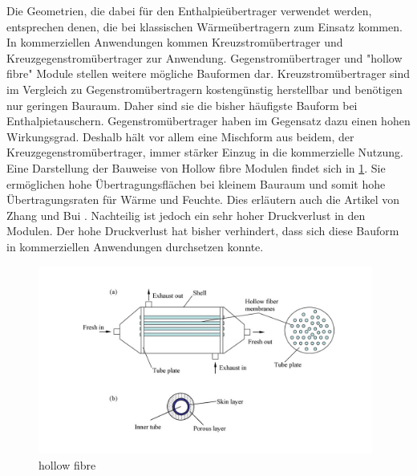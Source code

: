 \begin{normalsize}
\begin{LARGE}
Die Geometrien, die dabei für den Enthalpieübertrager verwendet werden, entsprechen denen, die bei klassischen Wärmeübertragern zum Einsatz kommen. In kommerziellen Anwendungen kommen Kreuzstromübertrager und Kreuzgegenstromübertrager zur Anwendung. Gegenstromübertrager und "hollow fibre" Module stellen weitere mögliche Bauformen dar. Kreuzstromübertrager sind im Vergleich zu Gegenstromübertragern kostengünstig herstellbar und benötigen nur geringen Bauraum. Daher sind sie die bisher häufigste Bauform bei Enthalpietauschern. Gegenstromübertrager haben im Gegensatz dazu einen hohen Wirkungsgrad. Deshalb hält vor allem eine Mischform aus beidem, der Kreuzgegenstromübertrager, immer stärker Einzug in die kommerzielle Nutzung. Eine Darstellung der Bauweise von Hollow fibre Modulen findet sich in \ref{fig:hollow fibre Modul}. Sie ermöglichen hohe Übertragungsflächen bei kleinem Bauraum und somit hohe Übertragungsraten für Wärme und Feuchte. Dies erläutern auch die Artikel von Zhang und Bui \cite{Zhang.2010} \cite{Bui.2010}. Nachteilig ist jedoch ein sehr hoher Druckverlust in den Modulen. Der hohe Druckverlust hat bisher verhindert, dass sich diese Bauform in kommerziellen Anwendungen durchsetzen konnte. 

\begin{figure} [h]
	\centering
	\includegraphics[width=0.98\textwidth]{pictures/hollow_fibre.jpg}
	\caption{hollow fibre}
	\label{fig:hollow fibre Modul}
\end{figure}


\end{LARGE}
\end{normalsize}
